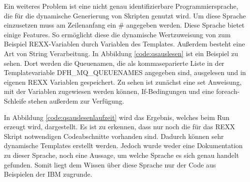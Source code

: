 Ein weiteres Problem ist eine nicht genau identifizierbare Programmiersprache, die für die dynamische Generierung von Skripten genutzt wird.
Um diese Sprache einzusetzen muss am Zeilenanfang ein \glqq\#\grqq{} angegeben werden.
Diese Sprache bietet einige Features.
So ermöglicht diese die dynamische Wertzuweisung von zum Beispiel REXX-Variablen durch Variablen des Templates.
Außerdem besteht eine Art von String Verarbeitung.
In Abbildung \ref{code:qsauslesen} ist ein Beispiel zu sehen.
Dort werden die Queuenamen, die als kommaseparierte Liste in der Templatevariable \glqq DFH\_MQ\_QUEUENAMES\grqq{} angegeben sind, ausgelesen und in eigenen REXX Variablen gespeichert.
Zu sehen ist zunächst eine \glqq set\grqq{} Anweisung, mit der Variablen zugewiesen werden können, If-Bedingungen und eine foreach-Schleife stehen außerdem zur Verfügung.

\begin{minipage}{\linewidth}

\end{minipage}

In Abbildung \ref{code:qsauslesenlaufzeit} wird das Ergebnis, welches beim Run erzeugt wird, dargestellt.
Es ist zu erkennen, dass nur noch die für das REXX Skript notwendigen Codeabschnitte vorhanden sind.
Dadurch können sehr dynamische Templates erstellt werden.
Jedoch wurde weder eine Dokumentation zu dieser Sprache, noch eine Aussage, um welche Sprache es sich genau handelt gefunden.
Somit liegt dem Wissen über diese Sprache nur der Code aus Beispielen der IBM zugrunde.

\begin{minipage}{\linewidth}

\end{minipage}

